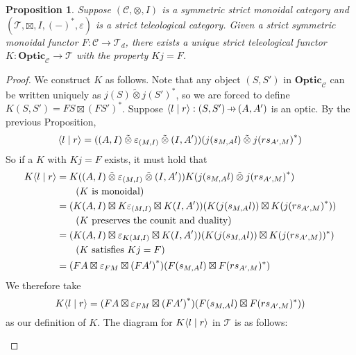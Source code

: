 \documentclass[11pt,letterpaper]{article}
\theoremstyle{plain}
\newtheorem{proposition}[theorem]{Proposition}
\theoremstyle{definition}
\newcommand{\C}{\mathscr{C}}
\newcommand{\T}{\mathscr{T}}
\newcommand{\Optic}{\mathbf{Optic}}
\newcommand{\switched}{\mathbin{\tilde{\otimes}}}
\newcommand{\teletimes}{\mathbin{\boxtimes}}
\newcommand{\rep}[2]{{\ensuremath \left\langle #1 \mid #2 \right\rangle}}
\newcommand{\hto}{\ensuremath{\,\mathaccent\shortmid\rightarrow\,}}
\begin{document}
\begin{proposition}
  Suppose $(\C, \otimes, I)$ is a symmetric strict monoidal category and $(\T, \teletimes, I, {(-)}^*, \varepsilon)$ is a strict teleological category. Given a strict symmetric monoidal functor $F : \C \to \T_d$, there exists a unique strict teleological functor $K : \Optic_\C \to \T$ with the property $Kj = F$.
\end{proposition}
\begin{proof}
  We construct $K$ as follows. Note that any object $(S, S')$ in $\Optic_\C$ can be written uniquely as $j(S) \switched {j(S')}^*$, so we are forced to define $K(S, S') = FS \teletimes {(FS')}^*$. Suppose $\rep{l}{r} : (S, S') \hto (A, A')$ is an optic. By the previous Proposition,
  \begin{align*}
    \rep{l}{r} = ((A, I) \switched \varepsilon_{(M, I)} \switched (I, A'))(j(s_{M,A}l) \switched {j(rs_{A', M})}^*)
  \end{align*}
  So if a $K$ with $Kj = F$ exists, it must hold that
  \begin{align*}
      K\rep{l}{r} 
      &= K((A, I) \switched \varepsilon_{(M, I)} \switched (I, A')) K(j(s_{M,A}l) \switched {j(rs_{A', M})}^*) \\
      &\qquad\text{($K$ is monoidal)} \\
      &= (K(A, I) \teletimes K\varepsilon_{(M, I)} \teletimes K(I, A')) (K(j(s_{M,A}l)) \teletimes K( {j(rs_{A', M})}^*)) \\
      &\qquad\text{($K$ preserves the counit and duality)} \\
      &= (K(A, I) \teletimes \varepsilon_{K(M,I)} \teletimes K(I, A')) (K(j(s_{M,A}l)) \teletimes K( {j(rs_{A', M})})^*) \\
      &\qquad\text{($K$ satisfies $Kj = F$)} \\
      &= (FA \teletimes \varepsilon_{FM} \teletimes {(FA')}^*) (F(s_{M,A}l) \teletimes F(rs_{A', M})^*)
  \end{align*}
  We therefore take \[  K\rep{l}{r} = (FA \teletimes \varepsilon_{FM} \teletimes {(FA')}^*) (F(s_{M,A}l) \teletimes F(rs_{A', M})^*)) \] as our definition of $K$. The diagram for $K\rep{l}{r}$ in $\T$ is as follows:
  \begin{center}
    
  \end{center}

\end{proof}
\end{document}
